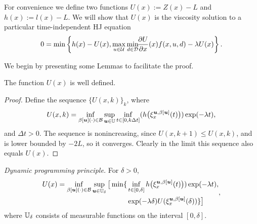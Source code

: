 \begin{for_journal}

For convenience we define two functions ${U(x):=Z(x)-L}$ and ${h(x):=l(x)-L}$. 
We will show that $U(x)$ is the viscosity solution to a particular time-independent HJ equation
%
\begin{equation}\label{eq:HJ_mdr}
    0 = \min\left\{h(x)-U(x), \max_{u\in\mathcal{U}} \min_{ d\in\mathcal{D}} \!\!\frac{\partial U}{\partial x}(x) f(x,u, d) - \lambda U(x)\right\}.
\end{equation}

We begin by presenting some Lemmas to facilitate the proof.
%
\begin{lemma}
The function $U(x)$ is well defined. 
\end{lemma} 
%
\begin{proof}
Define the sequence $\{U(x,k)\}_k$, where
%
\begin{equation}
U(x,k) = \inf_{\beta[\bm{u}](\cdot) \in \mathcal{B}} \sup_{\bm{u} \in \mathbb{U}} \inf_{t \in [0,k\Delta t]}(h\big(\xi_{x}^{\bm{u},\beta[\bm{u}]}(t)\big))\exp(-\lambda  t),
\end{equation}
%
and $\Delta t>0$. The sequence is nonincreasing, since $U(x,k+1) \leq U(x,k)$, and is lower bounded by $-2L$, so it converges. Clearly in the limit this sequence also equals $U(x)$.
\end{proof}



\begin{lemma} \label{dpp}
\emph{Dynamic programming principle.} For $\delta>0$,
%
\begin{equation}
\begin{split} 
U(x)= \inf_{\beta[\bm{u}](\cdot) \in \mathcal{B}} \sup_{\bm{u} \in \mathbb{U}_\delta} 
\big [
\min\{&\inf_{t \in [0, \delta]} h\big(\xi_{x}^{\bm{u},\beta[\bm{u}]}(t)\big))\exp(-\lambda  t), 
\\&\exp(-\lambda \delta)U(\xi_{x}^{\bm{u},\beta[\bm{u}]}(\delta))\}
\big ]
\end{split},
\end{equation}
%
where $\mathbb{U}_{\delta}$ consists of measurable functions on the interval
$[0,\delta]$.
\end{lemma}


\end{for_journal}
